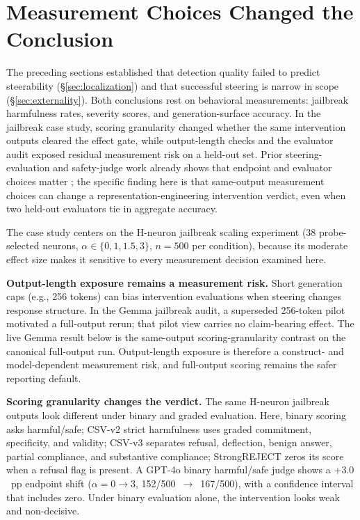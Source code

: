 \documentclass{article}
\begin{document}
\section{Measurement Choices Changed the Conclusion}
\label{sec:measurement}

The preceding sections established that detection quality failed to predict steerability (\S\ref{sec:localization}) and that successful steering is narrow in scope (\S\ref{sec:externality}).
Both conclusions rest on behavioral measurements: jailbreak harmfulness rates, severity scores, and generation-surface accuracy.
In the jailbreak case study, scoring granularity changed whether the same intervention outputs cleared the effect gate, while output-length checks and the evaluator audit exposed residual measurement risk on a held-out set.
Prior steering-evaluation and safety-judge work already shows that endpoint and evaluator choices matter \citep{pres2024reliable,souly2024strongreject,chen2025safer,eiras2025judge}; the specific finding here is that same-output measurement choices can change a representation-engineering intervention verdict, even when two held-out evaluators tie in aggregate accuracy.

The case study centers on the H-neuron jailbreak scaling experiment (38 probe-selected neurons, $\alpha \in \{0, 1, 1.5, 3\}$, $n = 500$ per condition), because its moderate effect size makes it sensitive to every measurement decision examined here.

\textbf{Output-length exposure remains a measurement risk.}
Short generation caps (e.g., 256 tokens) can bias intervention evaluations when steering changes response structure.
In the Gemma jailbreak audit, a superseded 256-token pilot motivated a full-output rerun; that pilot view carries no claim-bearing effect.
The live Gemma result below is the same-output scoring-granularity contrast on the canonical full-output run.
Output-length exposure is therefore a construct- and model-dependent measurement risk, and full-output scoring remains the safer reporting default.

\textbf{Scoring granularity changes the verdict.}
The same H-neuron jailbreak outputs look different under binary and graded evaluation.
Here, binary scoring asks harmful/safe; CSV-v2 strict harmfulness uses graded commitment, specificity, and validity; CSV-v3 separates refusal, deflection, benign answer, partial compliance, and substantive compliance; StrongREJECT zeros its score when a refusal flag is present.
A GPT-4o binary harmful/safe judge shows a $+3.0$~pp endpoint shift ($\alpha = 0 \to 3$, 152/500~$\to$~167/500), with a confidence interval that includes zero.
Under binary evaluation alone, the intervention looks weak and non-decisive.
\end{document}

